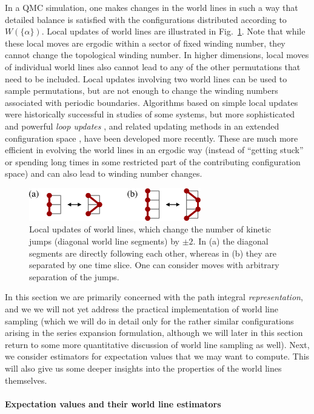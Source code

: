 \documentclass[draft,numberedheadings]{aipproc}
\begin{document}
In a QMC simulation, one makes changes in the world lines in such a way that detailed balance is satisfied with the configurations distributed according to 
$W(\{\alpha\})$. Local updates of world lines are illustrated in Fig.~\ref{wlmove}. Note that while these local moves are ergodic within a sector of fixed 
winding number, they cannot change the topological winding number. In higher dimensions, local moves of individual world lines also cannot lead to any of the 
other permutations that need to be included. Local updates involving two world lines can be used to sample permutations, but are not enough to change the 
winding numbers associated with periodic boundaries. Algorithms based on simple local updates were historically successful in studies of some systems, but 
more sophisticated and powerful {\it loop updates} \cite{evertz1}, and related updating methods in an extended configuration space \cite{prokofev96,syljuasen02}, 
have been developed more recently. These are much more efficient in evolving the world lines in an ergodic way (instead of ``getting stuck'' or spending long 
times in some restricted part of the contributing configuration space) and can also lead to winding number changes. 

\begin{figure}
\includegraphics[width=7.5cm]{wlmove.eps}
\caption{Local updates of world lines, which change the number of kinetic jumps (diagonal world line segments) by $\pm 2$. In (a) the diagonal segments 
are directly following each other, whereas in (b) they are separated by one time slice. One can consider moves with arbitrary separation of the jumps.}
\label{wlmove}
\end{figure}

In this section we are primarily concerned with the path integral {\it representation}, and we we will not yet address the practical implementation of world line 
sampling (which we will do in detail only for the rather similar configurations arising in the series expansion formulation, although we will later in this 
section return to some more quantitative discussion of world line sampling as well). Next, we consider estimators for expectation values that we may want to 
compute. This will also give us some deeper insights into the properties of the world lines themselves. 

\paragraph{Expectation values and their world line estimators}
\end{document}
